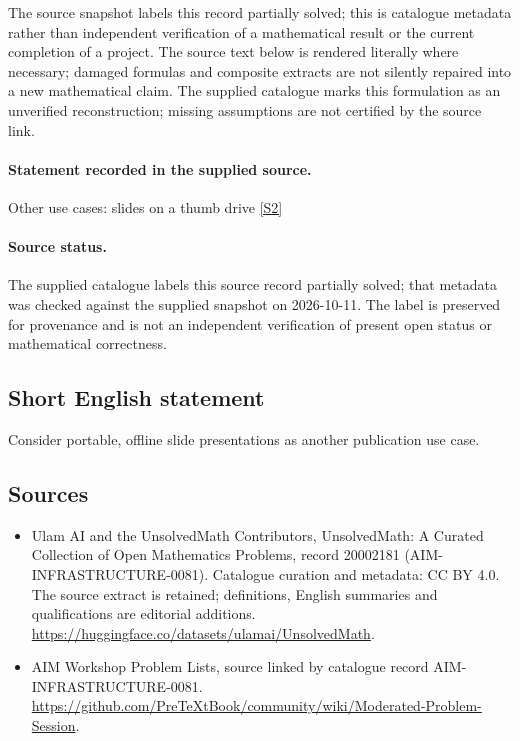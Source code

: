 \documentclass[11pt]{article}
\begin{document}
The source snapshot labels this record partially solved; this is catalogue metadata rather than independent verification of a mathematical result or the current completion of a project.
The source text below is rendered literally where necessary; damaged formulas and composite extracts are not silently repaired into a new mathematical claim.
The supplied catalogue marks this formulation as an unverified reconstruction; missing assumptions are not certified by the source link.
\paragraph{Statement recorded in the supplied source.}
Other use cases: slides on a thumb drive \href{https://github.com/PreTeXtBook/community/wiki/Moderated-Problem-Session}{[S2]}
\paragraph{Source status.}
The supplied catalogue labels this source record partially solved; that metadata was checked against the supplied snapshot on 2026-10-11. The label is preserved for provenance and is not an independent verification of present open status or mathematical correctness.
\subsection{Short English statement}
Consider portable, offline slide presentations as another publication use case.
\subsection{Sources}
\begin{itemize}
\item[S1] Ulam AI and the UnsolvedMath Contributors, UnsolvedMath: A Curated Collection of Open Mathematics Problems, record 20002181 (AIM-INFRASTRUCTURE-0081). Catalogue curation and metadata: CC BY 4.0. The source extract is retained; definitions, English summaries and qualifications are editorial additions.
\url{https://huggingface.co/datasets/ulamai/UnsolvedMath}.
\item[S2] AIM Workshop Problem Lists, source linked by catalogue record AIM-INFRASTRUCTURE-0081.
\url{https://github.com/PreTeXtBook/community/wiki/Moderated-Problem-Session}.
\end{itemize}
\end{document}

